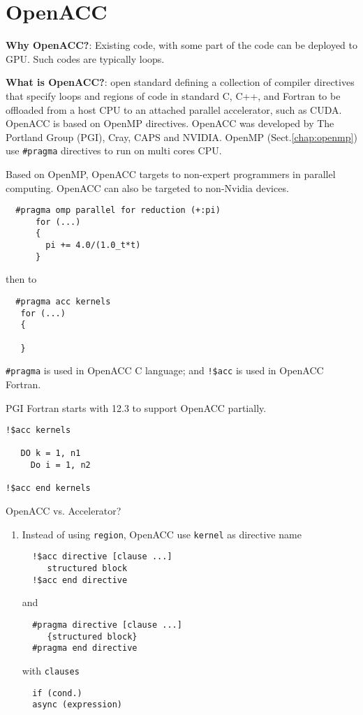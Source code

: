 \chapter{OpenACC}
\label{chap:openACC}

{\bf Why OpenACC?}: Existing code, with some part of the code can be deployed to
GPU. Such codes are typically loops.

{\bf What is OpenACC?}: open standard defining a collection of compiler
directives that specify loops and regions of code in standard C, C++, and
Fortran to be offloaded from a host CPU to an attached parallel accelerator,
such as CUDA.
OpenACC is based on OpenMP directives. OpenACC was developed by The Portland
Group (PGI), Cray, CAPS and NVIDIA.
 OpenMP (Sect.\ref{chap:openmp}) use
\verb!#pragma! directives to run on multi cores CPU. 

Based on OpenMP, OpenACC targets to non-expert programmers in parallel
computing. OpenACC can also be targeted to non-Nvidia devices. 

\begin{verbatim}
  #pragma omp parallel for reduction (+:pi)
      for (...)
      {
        pi += 4.0/(1.0_t*t)
      }
\end{verbatim}
then to
\begin{verbatim}
  #pragma acc kernels
   for (...) 
   {
   
   }
\end{verbatim}
\verb!#pragma! is used in OpenACC C language; and \verb.!$acc. is used in
OpenACC Fortran.

PGI Fortran starts with 12.3 to support OpenACC partially. 
\begin{verbatim}
!$acc kernels

   DO k = 1, n1
     Do i = 1, n2
     
!$acc end kernels
\end{verbatim}

OpenACC vs. Accelerator? 
\begin{enumerate}
  \item Instead of using \verb!region!, OpenACC use \verb!kernel! as directive
  name
  \begin{verbatim}
  !$acc directive [clause ...]
     structured block
  !$acc end directive 
  \end{verbatim}
  and 
  \begin{verbatim}
  #pragma directive [clause ...]
     {structured block}
  #pragma end directive
  \end{verbatim}
  with \verb!clauses!
  \begin{verbatim}
  if (cond.)
  async (expression)
  \end{verbatim}
\end{enumerate}

